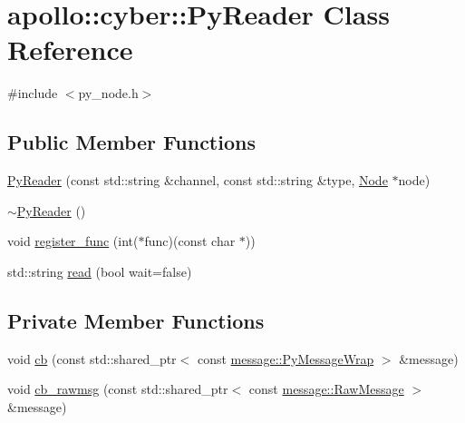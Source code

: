 \hypertarget{classapollo_1_1cyber_1_1PyReader}{\section{apollo\-:\-:cyber\-:\-:Py\-Reader Class Reference}
\label{classapollo_1_1cyber_1_1PyReader}
}


{\ttfamily \#include $<$py\-\_\-node.\-h$>$}

\subsection*{Public Member Functions}
\begin{DoxyCompactItemize}
\item 
\hyperlink{classapollo_1_1cyber_1_1PyReader_af5e97dfbc8da2df60b9c06bb4f0c7063}{Py\-Reader} (const std\-::string \&channel, const std\-::string \&type, \hyperlink{classapollo_1_1cyber_1_1Node}{Node} $\ast$node)
\item 
\hyperlink{classapollo_1_1cyber_1_1PyReader_a362405a62a638498f8eef80d8b257553}{$\sim$\-Py\-Reader} ()
\item 
void \hyperlink{classapollo_1_1cyber_1_1PyReader_a20dc2580266ac9c4004c507346956471}{register\-\_\-func} (int($\ast$func)(const char $\ast$))
\item 
std\-::string \hyperlink{classapollo_1_1cyber_1_1PyReader_a19b8a58d48a04ef2ec2a92901301815d}{read} (bool wait=false)
\end{DoxyCompactItemize}
\subsection*{Private Member Functions}
\begin{DoxyCompactItemize}
\item 
void \hyperlink{classapollo_1_1cyber_1_1PyReader_ac7f447071f9755e5e9e0d0cec4b5aa56}{cb} (const std\-::shared\-\_\-ptr$<$ const \hyperlink{classapollo_1_1cyber_1_1message_1_1PyMessageWrap}{message\-::\-Py\-Message\-Wrap} $>$ \&message)
\item 
void \hyperlink{classapollo_1_1cyber_1_1PyReader_a931bebe0f7e695ee3ffc01bb3978338b}{cb\-\_\-rawmsg} (const std\-::shared\-\_\-ptr$<$ const \hyperlink{structapollo_1_1cyber_1_1message_1_1RawMessage}{message\-::\-Raw\-Message} $>$ \&message)
\end{DoxyCompactItemize}
